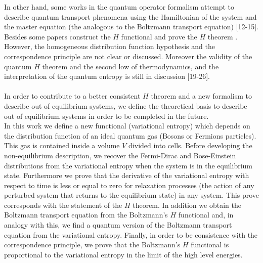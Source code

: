\documentclass{article}
\begin{document}
{In other hand, some works in the quantum operator formalism attempt to describe quantum transport phenomena using the Hamiltonian of the system and the master equation (the analogous to the Boltzmann transport equation) [12-15]. %
Besides some papers construct the $H$ functional and prove the $H$ theorem \cite{htheorem2, quantum1, quantum2}. However, the homogeneous distribution function hypothesis and the correspondence principle are not clear or discussed. Moreover the validity of the quantum $H$ theorem and the second low of thermodynamics, and the interpretation of the quantum entropy is still in discussion [19-26].\\ %
\\
In order to contribute to a better consistent $H$ theorem and a new formalism to describe out of equilibrium systems, we define the theoretical basis to describe out of equilibrium systems in order to be completed in the future.\\
In this work we define a new functional (variational entropy) which depends on the distribution function of an ideal quantum gas (Bosons or Fermions particles). This gas is contained inside a volume $V$ divided into cells. Before developing the non-equilibrium description, we recover the Fermi-Dirac and Bose-Einstein distributions from the variational entropy when the system is in the equilibrium state. Furthermore we prove that the derivative of the variational entropy with respect to time is less or equal to zero for relaxation processes (the action of any perturbed system that returns to the equilibrium state) in any system. This prove corresponds with the statement of the $H$ theorem. In addition we obtain the Boltzmann transport equation from the Boltzmann's $H$ functional and, in analogy with this, we find a quantum version of the Boltzmann transport equation from the variational entropy. Finally, in order to be consistence with the correspondence principle, we prove that the Boltzmann's $H$ functional is proportional to the variational entropy in the limit of the high level energies.}
\end{document}
